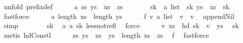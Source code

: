 \begin{isabellebody}
\ {\isacharparenleft}unfold\ prefix{\isacharunderscore}def{\isacharparenright}\isanewline
\ \ \ \ \isamarkupfalse%
\ a{}{\isacharcolon}\ {\isachardoublequoteopen}{\isasymexists}zs{\isachardot}\ ys\ {\isacharequal}\ xs\ {\isacharat}\ zs{\isachardoublequoteclose}\isanewline
\ \ \ \ \isamarkupfalse%
\ \isamarkupfalse%
\ sk\ {\isacharcolon}{\isacharcolon}\ {\isachardoublequoteopen}{\isacharprime}a\ list{\isachardoublequoteclose}\ \ sk{\isacharcolon}\ {\isachardoublequoteopen}ys\ {\isacharequal}\ xs\ {\isacharat}\ sk{\isachardoublequoteclose}\ \isamarkupfalse%
\ fastforce\isanewline
\ \ \ \ \isamarkupfalse%
\ a{}{\isacharcolon}\ {\isachardoublequoteopen}length\ xs\ {\isacharless}\ length\ ys{\isachardoublequoteclose}\isanewline
\ \ \ \ \isamarkupfalse%
\ f{}{\isacharcolon}\ {\isachardoublequoteopen}{\isasymAnd}v{\isachardot}\ {\isacharparenleft}{\isacharbrackleft}{\isacharbrackright}{\isacharcolon}{\isacharcolon}{\isacharprime}a\ list{\isacharparenright}\ {\isacharat}\ v\ {\isacharequal}\ v{\isachardoublequoteclose}\ \isamarkupfalse%
\ append{\isacharunderscore}Nil{}\ \isamarkupfalse%
\ simp\isanewline
\ \ \ \ \isamarkupfalse%
\ {\isachardoublequoteopen}{\isacharbrackleft}{\isacharbrackright}\ {\isasymnoteq}\ sk{\isachardoublequoteclose}\ \isamarkupfalse%
\ a{}\ a{}\ sk\ less{\isacharunderscore}not{\isacharunderscore}refl\ \isamarkupfalse%
\ force\isanewline
\ \ \ \ \isamarkupfalse%
\ {\isachardoublequoteopen}{\isasymexists}v{\isachardot}\ xs\ {\isacharat}\ hd\ sk\ {\isacharhash}\ v\ {\isacharequal}\ ys{\isachardoublequoteclose}\ \isamarkupfalse%
\ sk\ \isamarkupfalse%
\ {\isacharparenleft}metis\ hd{\isacharunderscore}Cons{\isacharunderscore}tl{\isacharparenright}\isanewline
\ \ \ \ \isamarkupfalse%
\ {\isachardoublequoteopen}{\isasymexists}zs{\isachardot}\ ys\ {\isacharequal}\ {\isacharparenleft}xs\ {\isacharat}\ {\isacharbrackleft}ys\ {\isacharbang}\ length\ xs{\isacharbrackright}{\isacharparenright}\ {\isacharat}\ zs{\isachardoublequoteclose}\ \isamarkupfalse%
\ f{}\ \isamarkupfalse%
\ fastforce\isanewline
\ \ \isamarkupfalse%
%
\endisatagproof
{\isafoldproof}%
%
\isadelimproof
\isanewline
%
\endisadelimproof
\isanewline
{}\isamarkupfalse%

\end{isabellebody}
